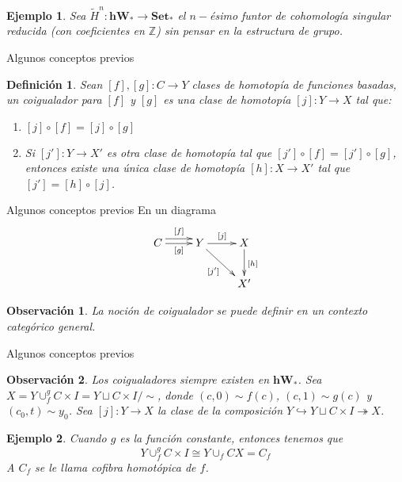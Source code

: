 \documentclass{beamer}
\newtheorem{df}{Definici\'on}
\newtheorem{ejem}{Ejemplo}
\newtheorem{obs}{Observaci\'on}
\newcommand{\con}{\mathbf{Set}}
\newcommand{\Z}{\mathbb{Z}}
\newcommand{\W}{\mathbf{hW}}
\begin{document}
\begin{frame}
	\begin{ejem}
		Sea $\tilde{H}^n \colon \mathbf{hW}_\ast\to \con_\ast$ el $n-$ésimo funtor de cohomología singular reducida (con coeficientes en $\Z$) sin pensar en la estructura de grupo.
	\end{ejem}
\end{frame}

\begin{frame}{Algunos conceptos previos}
	\begin{df}
		Sean $[f],[g]\colon C\to Y$ clases de homotopía de funciones basadas, un coigualador para $[f]$ y $[g]$ es una clase de homotopía $[j]\colon Y\to X$ tal que:
		\begin{enumerate}
			\item $[j]\circ[f]=[j]\circ[g]$
			\item Si $[j'] \colon Y\to X'$  es otra clase de homotopía tal que $[j']\circ[f]=[j']\circ[g]$, entonces existe una única clase de homotopía $[h]\colon X\to X'$ tal que $[j']=[h]\circ[j]$.
		\end{enumerate}
	\end{df}
\end{frame}

\begin{frame}{Algunos conceptos previos}
	En un diagrama		
		\[
		\xymatrix{ C \ar@<1ex>[r]^{[f]}\ar[r]_{[g]} & Y\ar[r]^{[j]} \ar[dr]_{[j']} & X\ar[d]^{[h]}\\
		&& X'
		}		
		\]
		
	\begin{obs}
		La noción de coigualador se puede definir en un contexto categórico general.
	\end{obs}
\end{frame}
	
\begin{frame}{Algunos conceptos previos}
	\begin{obs}
		Los coigualadores siempre existen en $\W_\ast$. Sea $X=Y\cup_f ^g C\times I=Y\sqcup C\times I /\sim$, donde $(c,0)\sim f(c)$, $(c,1)\sim g(c)$ y $(c_0 ,t)\sim y_0$. Sea $[j]\colon Y\to X$ la clase de la composición $Y \hookrightarrow Y\sqcup C\times I \twoheadrightarrow X$. 
	\end{obs}
	
	\begin{ejem}
		Cuando $g$ es la función constante, entonces tenemos que
		\[Y\cup_f ^g C\times I \cong Y\cup_f CX = C_f\]
		A $C_f$ se le llama cofibra homotópica de $f$.
	\end{ejem}
\end{frame}
\end{document}
